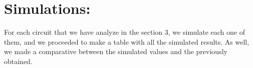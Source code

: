 \section{Simulations:}

For each circuit that we have analyze in the section 3, we simulate each one of them, and we proceeded to make a table with all the simulated results. As well, we made a comparative between the simulated values and the previously obtained.
